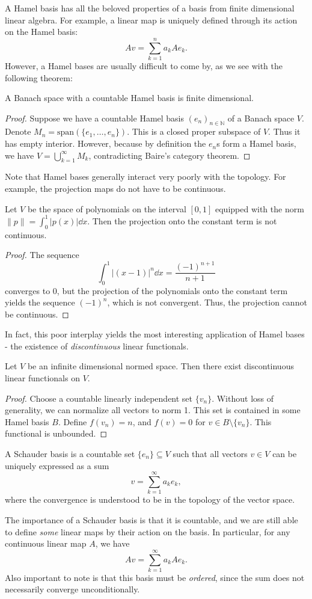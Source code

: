 \documentclass[twoside,symmetric, openany, 12pt]{./tuftebook}
\theoremstyle{definition}
\theoremstyle{definition}
\theoremstyle{definition}
\newcommand{\N}{\mathbb{N}}
\begin{document}
	A Hamel basis has all the beloved properties of a basis from finite dimensional linear algebra. For example, a linear map is uniquely defined through its action on the Hamel basis:
	\[Av = \sum_{k=1}^n a_k Ae_k.\]
	However, a Hamel bases are usually difficult to come by, as we see with the following theorem:
	\begin{Theorem}
		A Banach space with a countable Hamel basis is finite dimensional. 
	\end{Theorem}
\begin{proof}
	Suppose we have a countable Hamel basis $(e_n)_{n\in \N}$ of a Banach space $V$. Denote $M_n=\text{span}(\{e_1, \dots, e_n\})$. This is a closed proper subspace of $V$. Thus it has empty interior. However, because by definition the $e_n$s form a Hamel basis, we have $V=\bigcup_{k=1}^\infty M_k$, contradicting Baire's category theorem.
\end{proof}
Note that Hamel bases generally interact very poorly with the topology. For example, the projection maps do not have to be continuous.
\begin{Example}
	Let $V$ be the space of polynomials on the interval $[0,1]$ equipped with the norm $\|p\|=\int_0^1 |p(x)|\dd{x}$. Then the projection onto the constant term is not continuous.
\end{Example}
\begin{proof}
	The sequence
	\[\int_0^1 |(x-1)|^n\dd{x} = \frac{(-1)^{n+1}}{n+1}\]
	converges to $0$, but the projection of the polynomials onto the constant term yields the sequence $(-1)^n$, which is not convergent. Thus, the projection cannot be continuous.
\end{proof}
In fact, this poor interplay yields the most interesting application of Hamel bases - the existence of \emph{discontinuous} linear functionals.
\begin{Theorem}\label{thm:discontinuousfunctionals}
	Let $V$ be an infinite dimensional normed space. Then there exist discontinuous linear functionals on $V$.
\end{Theorem}
\begin{proof}
	Choose a countable linearly independent set $\{v_n\}$. Without loss of generality, we can normalize all vectors to norm 1. This set is contained in some Hamel basis $B$. Define $f(v_n)=n$, and $f(v)=0$ for $v\in B\setminus \{v_n\}$. This functional is unbounded.
\end{proof}
	\begin{Definition}
		A Schauder basis is a countable set $\{e_n\}\subseteq V$ such that all vectors $v\in V$ can be uniquely expressed as a sum
		\[v=\sum_{k=1}^\infty a_k e_k,\]
		where the convergence is understood to be in the topology of the vector space. 
	\end{Definition}
The importance of a Schauder basis is that it is countable, and we are still able to define \emph{some} linear maps by their action on the basis. In particular, for any continuous linear map $A$, we have
\[Av = \sum_{k=1}^\infty a_k Ae_k.\]
Also important to note is that this basis must be \emph{ordered}, since the sum does not necessarily converge unconditionally. 
\end{document}
